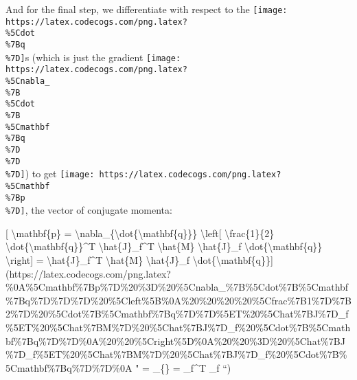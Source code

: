 \documentclass[]{article}
\begin{document}
And for the final step, we differentiate with respect to the
\texttt{[image: https://latex.codecogs.com/png.latex?\\\%5Cdot\\\%7Bq\\\%7D]}s (which
is just the gradient
\texttt{[image: https://latex.codecogs.com/png.latex?\\\%5Cnabla\_\\\%7B\\\%5Cdot\\\%7B\\\%5Cmathbf\\\%7Bq\\\%7D\\\%7D\\\%7D]})
to get
\texttt{[image: https://latex.codecogs.com/png.latex?\\\%5Cmathbf\\\%7Bp\\\%7D]}, the
vector of conjugate momenta:

{[} \textbackslash{}mathbf\{p\} =
\textbackslash{}nabla\_\{\textbackslash{}dot\{\textbackslash{}mathbf\{q\}\}\}
\textbackslash{}left{[} \textbackslash{}frac\{1\}\{2\}
\textbackslash{}dot\{\textbackslash{}mathbf\{q\}\}\^{}T
\textbackslash{}hat\{J\}\_f\^{}T \textbackslash{}hat\{M\}
\textbackslash{}hat\{J\}\_f \textbackslash{}dot\{\textbackslash{}mathbf\{q\}\}
\textbackslash{}right{]} = \textbackslash{}hat\{J\}\_f\^{}T
\textbackslash{}hat\{M\} \textbackslash{}hat\{J\}\_f
\textbackslash{}dot\{\textbackslash{}mathbf\{q\}\}{]}(https://latex.codecogs.com/png.latex?\%0A\%5Cmathbf\%7Bp\%7D\%20\%3D\%20\%5Cnabla\_\%7B\%5Cdot\%7B\%5Cmathbf\%7Bq\%7D\%7D\%7D\%20\%5Cleft\%5B\%0A\%20\%20\%20\%20\%5Cfrac\%7B1\%7D\%7B2\%7D\%20\%5Cdot\%7B\%5Cmathbf\%7Bq\%7D\%7D\%5ET\%20\%5Chat\%7BJ\%7D\_f\%5ET\%20\%5Chat\%7BM\%7D\%20\%5Chat\%7BJ\%7D\_f\%20\%5Cdot\%7B\%5Cmathbf\%7Bq\%7D\%7D\%0A\%20\%20\%5Cright\%5D\%0A\%20\%20\%3D\%20\%5Chat\%7BJ\%7D\_f\%5ET\%20\%5Chat\%7BM\%7D\%20\%5Chat\%7BJ\%7D\_f\%20\%5Cdot\%7B\%5Cmathbf\%7Bq\%7D\%7D\%0A
"  = \nabla\_\{\} 
 = \_f\^{}T  \_f  ``)
\end{document}
